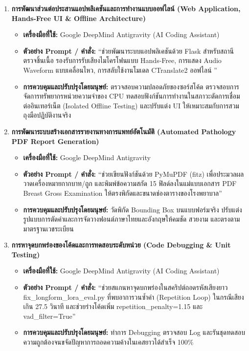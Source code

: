 \begin{enumerate}[label=\textbf{\arabic*.}, leftmargin=*, align=left]
\item \textbf{การพัฒนาส่วนต่อประสานแอปพลิเคชันและการทำงานแบบออฟไลน์ (Web Application, Hands-Free UI \& Offline Architecture)}
\begin{itemize}[leftmargin=1.5em]
    \item \textbf{เครื่องมือที่ใช้:} Google DeepMind Antigravity (AI Coding Assistant)
    \item \textbf{ตัวอย่าง Prompt / คำสั่ง:} ``ช่วยพัฒนาระบบแอปพลิเคชันด้วย Flask สำหรับสถานีตรวจชิ้นเนื้อ รองรับการรับเสียงไมโครโฟนแบบ Hands-Free, การแสดง Audio Waveform แบบเคลื่อนไหว, การสลับใช้งานโมเดล CTranslate2 ออฟไลน์ ''
    \item \textbf{การควบคุมและปรับปรุงโดยมนุษย์:} ตรวจสอบความปลอดภัยของซอร์สโค้ด ตรวจสอบการจัดการทรัพยากรหน่วยความจำของ CPU ทดสอบฟังก์ชันการทำงานในสภาวะตัดการเชื่อมต่ออินเทอร์เน็ต (Isolated Offline Testing) และปรับแต่ง UI ให้เหมาะสมกับการสวมถุงมือปฏิบัติงานจริง
\end{itemize}

\item \textbf{การพัฒนาระบบสร้างเอกสารรายงานทางการแพทย์อัตโนมัติ (Automated Pathology PDF Report Generation)}
\begin{itemize}[leftmargin=1.5em]
    \item \textbf{เครื่องมือที่ใช้:} Google DeepMind Antigravity
    \item \textbf{ตัวอย่าง Prompt / คำสั่ง:} ``ช่วยเขียนฟังก์ชันด้วย PyMuPDF (fitz) เพื่อประมวลผลวาดเครื่องหมายกากบาท/ถูก และพิมพ์ข้อความสกัด 15 ฟิลด์ลงในแม่แบบเอกสาร PDF Breast Gross Examination ให้ตรงพิกัดและขนาดช่องตารางของโรงพยาบาล''
    \item \textbf{การควบคุมและปรับปรุงโดยมนุษย์:} วัดพิกัด Bounding Box บนแบบฟอร์มจริง ปรับแต่งรูปแบบการตัดคำและการจัดวางฟอนต์ภาษาไทยและอังกฤษให้คมชัด สวยงาม และตรงตามมาตรฐานเวชระเบียน
\end{itemize}

\item \textbf{การหาจุดบกพร่องของโค้ดและการทดสอบระดับหน่วย (Code Debugging \& Unit Testing)}
\begin{itemize}[leftmargin=1.5em]
    \item \textbf{เครื่องมือที่ใช้:} Google DeepMind Antigravity (AI Coding Assistant)
    \item \textbf{ตัวอย่าง Prompt / คำสั่ง:} ``ช่วยสแกนหาจุดบกพร่องในสคริปต์ถอดรหัสเสียงยาว fix\_longform\_lora\_eval.py ที่พบอาการวนซ้ำคำ (Repetition Loop) ในกรณีเสียงเกิน 27.5 วินาที และช่วยร่างโค้ดเพิ่ม repetition\_penalty=1.15 และ vad\_filter=True''
    \item \textbf{การควบคุมและปรับปรุงโดยมนุษย์:} ทำการ Debugging ตรวจสอบ Log และรันชุดทดสอบความถูกต้องจนขจัดปัญหาการถอดความค้างในเคสยาวได้สำเร็จ 100\%
\end{itemize}
\end{enumerate}